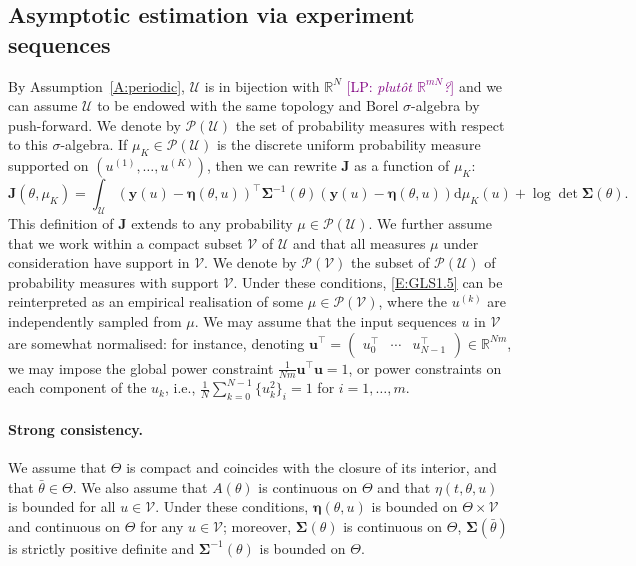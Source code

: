\documentclass[twocolumn]{autart}
\newcommand{\LP}[1]{{\textcolor{purple}{[LP: \textit{#1}]}}}
\theoremstyle{definition}
\theoremstyle{remark}
\newcommand{\R}{\mathbb{R}}
\newcommand{\diff}{\mathrm{d}}
\newcommand{\U}{\mathcal{U}}
\newcommand{\V}{\mathcal{V}}
\renewcommand{\P}{\mathcal{P}}
\newcommand{\yb}{\mathbf{y}}
\newcommand{\ub}{\mathbf{u}}
\newcommand{\Jb}{\mathbf{J}}
\newcommand{\etab}{\boldsymbol{\eta}}
\newcommand{\Sigmab}{\boldsymbol{\Sigma}}
\begin{document}
\subsection{Asymptotic estimation via experiment sequences}
\label{S:FIM}
By Assumption~\ref{A:periodic}, $\mathcal{U}$ is in bijection with $\R^N$ \LP{plutôt $\R^{mN}$?} and we can assume $\mathcal{U}$ {to be} endowed with the same topology and Borel $\sigma$-algebra  by push-forward. We denote by $\P(\U)$ the set of probability measures with respect to this $\sigma$-algebra. If $\mu_K\in \P(\U)$ is the discrete uniform probability measure supported on $(u^{(1)},\dots, u^{(K)})$, then we can rewrite $\Jb$ as a function of $\mu_K$:
\begin{equation}\label{E:GLS3}
\Jb(\theta,\mu_K)
=
\int_\U
(\yb(u)-\etab(\theta,u))^\top 
\Sigmab^{-1}(\theta)
(\yb(u)-\etab(\theta,u))\diff \mu_K(u)+\log\det \Sigmab(\theta).
\end{equation}
This definition of $\Jb$ extends  to any probability $\mu\in \P(\U)$. We further assume that we work within a compact subset $\V$ of $\U$ and that all measures $\mu$ under consideration have support in $\V$. We denote by $\P(\V)$ the subset of $\P(\U)$ of probability measures with support $\V$.
Under these conditions, \eqref{E:GLS1.5} can be reinterpreted as an empirical realisation of some $\mu\in \P(\V)$, where the $u^{(k)}$ are independently sampled from $\mu$. We may assume that the input sequences $u$ in $\V$ are somewhat normalised: for instance, 
denoting $\ub^\top=\begin{pmatrix}
u_0^\top & \cdots & u_{N-1}^\top
\end{pmatrix}\in \R^{Nm}$,
we may impose the global power constraint $\frac{1}{Nm} \ub^\top\ub=1$, or power constraints on each component of the $u_k$, i.e., 
$\frac1N \sum_{k=0}^{N-1} \{u_k^2\}_i=1$ for $i=1,\ldots,m$. 


\paragraph{Strong consistency.}
We assume that $\Theta$ is compact and coincides with the closure of its interior, and that $\bar\theta\in\Theta$. We also assume that $A(\theta)$ is continuous on $\Theta$ and that $\eta(t,\theta,u)$ is bounded for all $u\in\V$. Under these conditions, $\etab(\theta,u)$ is bounded on $\Theta\times\V$ and continuous on $\Theta$ for any $u\in\V$; moreover, $\Sigmab(\theta)$ is continuous on $\Theta$, $\Sigmab(\bar\theta)$ is strictly positive definite and $\Sigmab^{-1}(\theta)$ is bounded on $\Theta$. 
\end{document}
